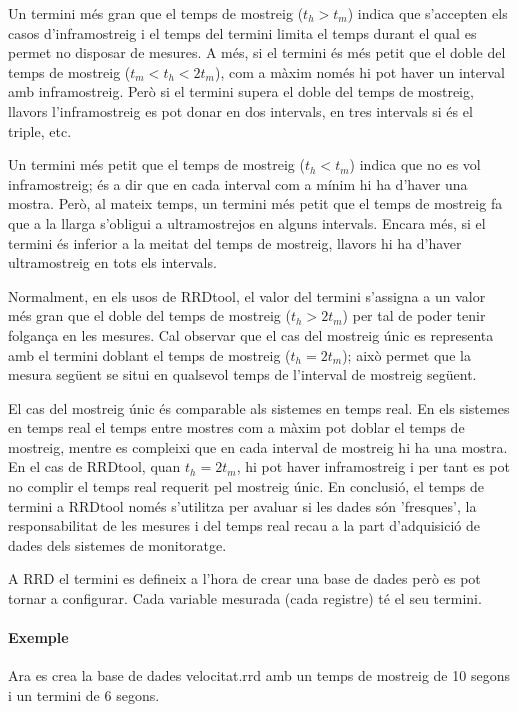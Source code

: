 Un termini més gran que el temps de mostreig  ($t_h>t_m$) indica que s'accepten els casos d'inframostreig i el temps del termini limita el temps durant el qual es permet no disposar de mesures. A més, si el termini és més petit que el doble del temps de mostreig ($t_m<t_h<2t_m$), com a màxim només hi pot haver un interval amb inframostreig. Però si el termini supera el doble del temps de mostreig, llavors l'inframostreig es pot donar en dos intervals, en tres intervals si és el triple, etc.

Un termini més petit que el temps de mostreig ($t_h<t_m$) indica que no es vol inframostreig; és a dir que en cada interval com a mínim hi ha d'haver una mostra. Però, al mateix temps, un termini més petit que el temps de mostreig fa que a la llarga s'obligui a ultramostrejos en alguns intervals. Encara més, si el termini és inferior a la meitat del temps de mostreig, llavors hi ha d'haver ultramostreig en tots els intervals.

Normalment, en els usos de RRDtool, el valor del termini s'assigna a un valor més gran que el doble del temps de mostreig ($t_h>2t_m$) per tal de poder tenir folgança en les mesures. Cal observar que el cas del mostreig únic es representa amb el termini doblant el temps de mostreig ($t_h=2t_m$); això permet que la mesura següent se situi en qualsevol temps de l'interval de mostreig següent.

El cas del mostreig únic és comparable als sistemes en temps real. En els sistemes en temps real el temps entre mostres com a màxim pot doblar el temps de mostreig, mentre es compleixi que en cada interval de mostreig hi ha una mostra. En el cas de RRDtool, quan $t_h=2t_m$, hi pot haver inframostreig i per tant es pot no complir el temps real requerit pel mostreig únic. 
En conclusió, el temps de termini a RRDtool només s'utilitza per avaluar si les dades són 'fresques', la responsabilitat de les mesures i del temps real recau a la part d'adquisició de dades dels sistemes de monitoratge. 

A RRD el termini es defineix a l'hora de crear una base de dades però es pot tornar a configurar. Cada variable mesurada (cada registre) té el seu termini.


\paragraph{Exemple} Ara es crea la base de dades velocitat.rrd amb un temps de mostreig de 10 segons i un termini de 6 segons.


